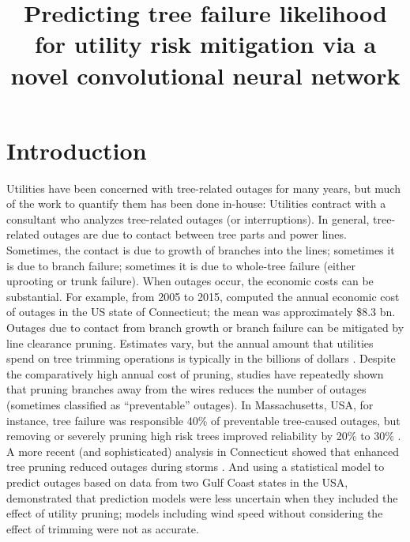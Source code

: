 \documentclass[11pt,twoside]{article}
\numberwithin{equation}{section}
\newcommand{\?}{\stackrel{?}{=}}
\begin{document}
\title{Predicting tree failure likelihood for utility risk mitigation via a novel convolutional neural network}
\date{}
\maketitle


\section{Introduction}
Utilities have been concerned with tree-related outages for many years, but much of the work to quantify them has been done in-house: Utilities contract with a consultant who analyzes tree-related outages (or interruptions). In general, tree-related outages are due to contact between tree parts and power lines. Sometimes, the contact is due to growth of branches into the lines; sometimes it is due to branch failure; sometimes it is due to whole-tree failure (either uprooting or trunk failure). When outages occur, the economic costs can be substantial. For example, from 2005 to 2015, \cite{graziano2020wider} computed the annual economic cost of outages in the US state of Connecticut; the mean was approximately \$8.3 bn.  Outages due to contact from branch growth or branch failure can be mitigated by line clearance pruning. Estimates vary, but the annual amount that utilities spend on tree trimming operations is typically in the billions of dollars \cite{guggenmoos2003effects}. Despite the comparatively high annual cost of pruning, studies have repeatedly shown that pruning branches away from the wires reduces the number of outages (sometimes classified as “preventable” outages). In Massachusetts, USA, for instance, tree failure was responsible 40\% of preventable tree-caused outages, but removing or severely pruning high risk trees improved reliability by 20\% to 30\% \cite{simpson1996treecaused}. A more recent (and sophisticated) analysis in Connecticut showed that enhanced tree pruning reduced outages during storms \cite{parent2019analysis}. And using a statistical model to predict outages based on data from two Gulf Coast states in the USA, \citet{nateghi2014power} demonstrated that prediction models were less uncertain when they included the effect of utility pruning; models including wind speed without considering the effect of trimming were not as accurate.
\end{document}
